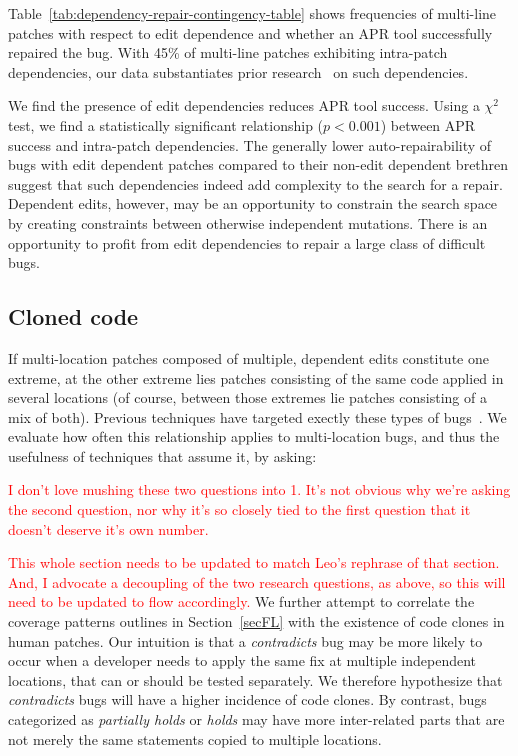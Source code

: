 \documentclass[10pt, conference]{IEEEtran}
\newcommand\todo[1]{\textcolor{red}{#1}}
\begin{document}
Table~\ref{tab:dependency-repair-contingency-table}
shows frequencies of multi-line patches with respect to edit dependence 
and whether an APR tool successfully repaired the bug.
With 45\% of multi-line patches exhibiting intra-patch dependencies, 
our data substantiates prior research~\cite{zhong2015} on 
such dependencies.


We find the presence of edit dependencies 
reduces APR tool success.
Using a $\chi^2$ test, we find a statistically significant relationship ($p < 0.001$)
between APR success and intra-patch dependencies.
The generally lower auto-repairability of bugs with edit dependent patches compared 
to their non-edit dependent brethren suggest that such dependencies indeed 
add complexity to the search for a repair.
Dependent edits, however, may 
be an opportunity to constrain the search space by creating constraints between 
otherwise independent mutations. There is an opportunity to profit from edit 
dependencies to repair a large class of difficult bugs.


\subsection{Cloned code}

If multi-location patches composed of multiple, dependent edits constitute one
extreme, at the other extreme lies patches consisting of the same code applied
in several locations (of course, between those extremes lie patches consisting
of a mix of both). Previous techniques have targeted exectly these types of
bugs~\cite{wang2018,saha2019harnessing}.  We evaluate how often this relationship applies to
multi-location bugs, and thus the usefulness of techniques that assume it, by asking: 

\todo{I don't love mushing these two questions into 1.  It's not obvious why
  we're asking the second question, nor why it's so closely tied to the first
  question that it doesn't deserve it's own number.}

\todo{This whole section needs to be updated to match Leo's rephrase of that section.  And, I
  advocate a decoupling of the two research questions, as above, so this will
  need to be updated to flow accordingly.}
We further attempt to correlate the coverage patterns outlines in
Section~\ref{secFL} with the existence of code clones in human patches.  Our 
intuition is that a \emph{contradicts} bug may be more likely to occur when a
developer needs to apply the same fix at multiple independent locations, that
can or should be tested separately.  We therefore 
 hypothesize that \emph{contradicts} bugs will have a higher incidence of code
clones. By contrast, bugs categorized as \emph{partially holds} or \emph{holds} may have
more inter-related parts that are not merely the same statements copied to
multiple locations.
\end{document}
